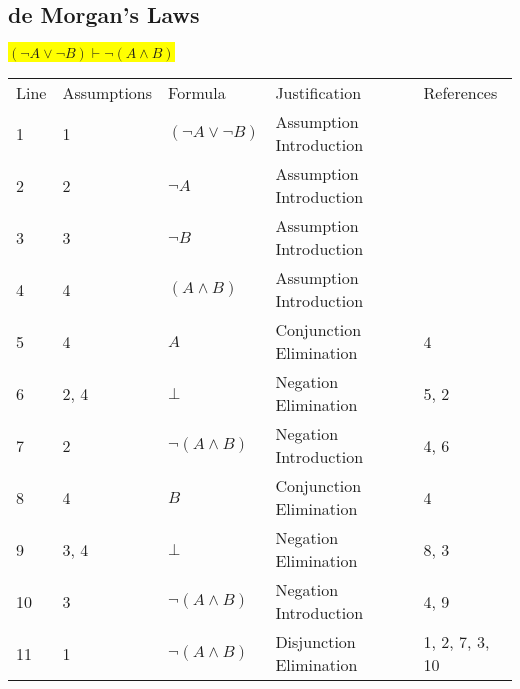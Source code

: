 \documentclass[12pt]{article}
\newcommand{\pr}[1]{\bigbreak \colorbox{Yellow}{$#1$} \smallbreak}
\begin{document}
\begin{flushleft}
\section{de Morgan’s Laws}
\pr{(\neg A\lor \neg B) \vdash \neg (A\land B)}
\begin{tabular}{lllll}
    Line & Assumptions & Formula & Justification & References \\
    1 & 1 & $(\neg A\lor \neg B)$  & Assumption Introduction &  \\
    2 & 2 & $\neg A$  & Assumption Introduction &  \\
    3 & 3 & $\neg B$  & Assumption Introduction &  \\
    4 & 4 & $(A\land B)$  & Assumption Introduction &  \\
    5 & 4 & $A$  & Conjunction Elimination & 4 \\
    6 & 2, 4 & $\bot $  & Negation Elimination & 5, 2 \\
    7 & 2 & $\neg (A\land B)$  & Negation Introduction & 4, 6 \\
    8 & 4 & $B$  & Conjunction Elimination & 4 \\
    9 & 3, 4 & $\bot $  & Negation Elimination & 8, 3 \\
    10 & 3 & $\neg (A\land B)$  & Negation Introduction & 4, 9 \\
    11 & 1 & $\neg (A\land B)$  & Disjunction Elimination & 1, 2, 7, 3, 10 \\
\end{tabular}


\end{flushleft}
\end{document}
